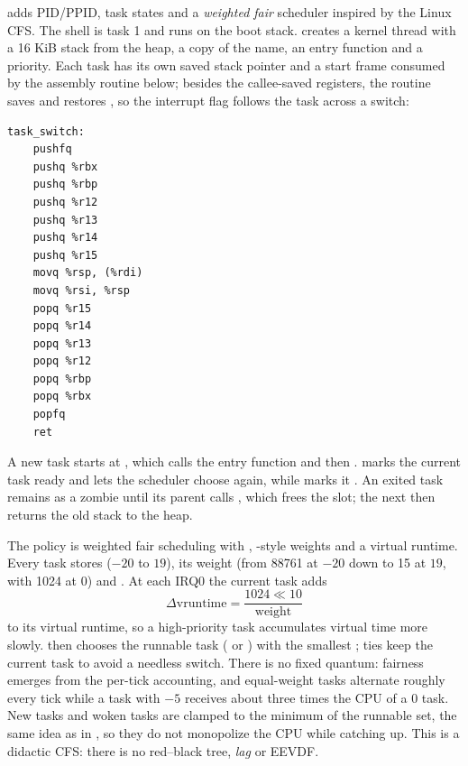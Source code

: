 adds PID/PPID, task states and a \emph{weighted fair}
scheduler inspired by the Linux CFS. The shell is task 1 and runs on the boot
stack.  creates a kernel thread with a 16 KiB
stack from the heap, a copy of the name, an entry function and a priority.
Each task has its own saved stack pointer and a start frame consumed by the
assembly routine below; besides the callee-saved registers, the routine saves
and restores , so the interrupt flag follows the task across a
switch:

\begin{lstlisting}[caption={Context switch with \code{RFLAGS}.},label={lst:ctxswitch}]
task_switch:
    pushfq
    pushq %rbx
    pushq %rbp
    pushq %r12
    pushq %r13
    pushq %r14
    pushq %r15
    movq %rsp, (%rdi)
    movq %rsi, %rsp
    popq %r15
    popq %r14
    popq %r13
    popq %r12
    popq %rbp
    popq %rbx
    popfq
    ret
\end{lstlisting}

A new task starts at , which calls the entry function
and then .  marks the current task ready
and lets the scheduler choose again, while  marks it
. An exited task remains as a zombie until its parent calls
, which frees the slot; the next  then returns the old
stack to the heap.

The policy is weighted fair scheduling with ,
-style weights and a virtual runtime. Every task
stores  ($-20$ to $19$), its weight (from 88761 at $-20$ down to 15
at $19$, with 1024 at $0$) and . At each IRQ0 the current task
adds
\[
  \Delta \mathrm{vruntime} = \frac{1024 \ll 10}{\mathrm{weight}}
\]
to its virtual runtime, so a high-priority task accumulates virtual time more
slowly.  then chooses the runnable task ( or
) with the smallest ; ties keep the current task
to avoid a needless switch. There is no fixed quantum: fairness emerges from
the per-tick accounting, and equal-weight tasks alternate roughly every tick
while a task with  $-5$ receives about three times the CPU of a
 $0$ task. New tasks and woken tasks are clamped to the minimum
 of the runnable set, the same idea as  in
, so they do not monopolize the CPU while catching
up. This is a didactic CFS: there is no red--black tree, \emph{lag} or EEVDF.

